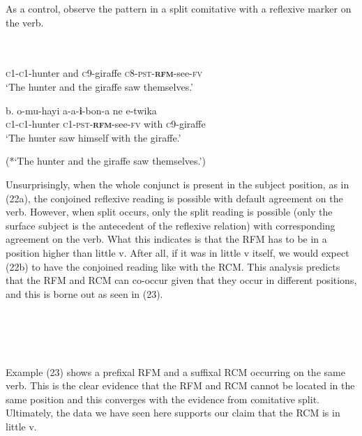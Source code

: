 \documentclass[output=paper]{langsci/langscibook}
\begin{document}
  As a control, observe the pattern in a split comitative with a reflexive marker on the verb. 


\ea\label{ex:}
  \\
\ea\label{ex:}
  \\

       \textsc{c1-c1}-hunter   and   \textsc{c}9-giraffe   \textsc{c}8-\textsc{pst-}\textbf{\textsc{rfm}}-see-\textsc{fv} \\
\glt   ‘The hunter and the giraffe saw themselves.’
\z

\gll \textup{b.}  o-mu-hayi   a-a-\textbf{i}-bon-a     ne   e-twika \\
       \textsc{c1-c1}-hunter  \textsc{c}1-\textsc{pst-}\textbf{\textsc{rfm}}-see-\textsc{fv}   with   \textsc{c}9-giraffe \\
\glt   ‘The hunter saw himself with the giraffe.’
\z

\glt   (*‘The hunter and the giraffe saw themselves.’)
\z

Unsurprisingly, when the whole conjunct is present in the subject position, as in (22a), the conjoined reflexive reading is possible with default agreement on the verb. However, when split occurs, only the split reading is possible (only the surface subject is the antecedent of the reflexive relation) with corresponding agreement on the verb. What this indicates is that the RFM has to be in a position higher than little v. After all, if it was in little v itself, we would expect (22b) to have the conjoined reading like with the RCM. This analysis predicts that the RFM and RCM can co-occur given that they occur in different positions, and this is borne out as seen in (23).


\ea\label{ex:}
  \\
\ea\label{ex:}
\\
\ea\label{ex:}
\\
\ea\label{ex:}
\\


Example (23) shows a prefixal RFM and a suffixal RCM occurring on the same verb. This is the clear evidence that the RFM and RCM cannot be located in the same position and this converges with the evidence from comitative split. Ultimately, the data we have seen here supports our claim that the RCM is in little v. 
\end{document}
